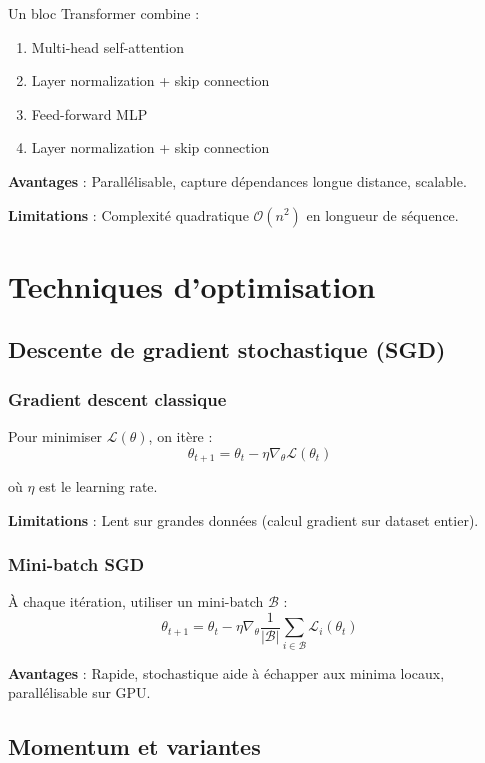 Un bloc Transformer combine :
\begin{enumerate}
    \item Multi-head self-attention
    \item Layer normalization + skip connection
    \item Feed-forward MLP
    \item Layer normalization + skip connection
\end{enumerate}

\textbf{Avantages} : Parallélisable, capture dépendances longue distance, scalable.

\textbf{Limitations} : Complexité quadratique $\mathcal{O}(n^2)$ en longueur de séquence.

\section{Techniques d'optimisation}

\subsection{Descente de gradient stochastique (SGD)}

\subsubsection{Gradient descent classique}

Pour minimiser $\mathcal{L}(\theta)$, on itère :
\[
\theta_{t+1} = \theta_t - \eta \nabla_\theta \mathcal{L}(\theta_t)
\]

où $\eta$ est le learning rate.

\textbf{Limitations} : Lent sur grandes données (calcul gradient sur dataset entier).

\subsubsection{Mini-batch SGD}

À chaque itération, utiliser un mini-batch $\mathcal{B}$ :
\[
\theta_{t+1} = \theta_t - \eta \nabla_\theta \frac{1}{|\mathcal{B}|} \sum_{i \in \mathcal{B}} \mathcal{L}_i(\theta_t)
\]

\textbf{Avantages} : Rapide, stochastique aide à échapper aux minima locaux, parallélisable sur GPU.

\subsection{Momentum et variantes}

